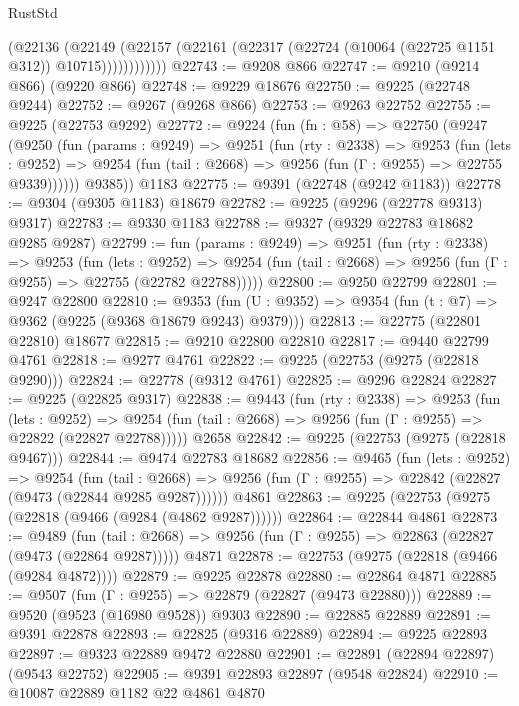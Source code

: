 \begin{lexlean}{RustStd}
\begin{coremodule}
                (@22136
                  (@22149
                    (@22157 (@22161 (@22317 (@22724 (@10064 (@22725 @1151 @312)) @10715))))))))))))
@22743 := @9208 @866
@22747 := @9210 (@9214 @866) (@9220 @866)
@22748 := @9229 @18676
@22750 := @9225 (@22748 @9244)
@22752 := @9267 (@9268 @866)
@22753 := @9263 @22752
@22755 := @9225 (@22753 @9292)
@22772 := @9224
    (fun (fn : @58) =>
    @22750
      (@9247
        (@9250
          (fun (params : @9249) =>
          @9251
            (fun (rty : @2338) =>
            @9253
              (fun (lets : @9252) =>
              @9254 (fun (tail : @2668) => @9256 (fun (Γ : @9255) => @22755 @9339))))))
        @9385))
    @1183
@22775 := @9391 (@22748 (@9242 @1183))
@22778 := @9304 (@9305 @1183) @18679
@22782 := @9225 (@9296 (@22778 @9313) @9317)
@22783 := @9330 @1183
@22788 := @9327 (@9329 @22783 @18682 @9285 @9287)
@22799 := fun (params : @9249) =>
  @9251
    (fun (rty : @2338) =>
    @9253
      (fun (lets : @9252) =>
      @9254 (fun (tail : @2668) => @9256 (fun (Γ : @9255) => @22755 (@22782 @22788)))))
@22800 := @9250 @22799
@22801 := @9247 @22800
@22810 := @9353
    (fun (U : @9352) => @9354 (fun (t : @7) => @9362 (@9225 (@9368 @18679 @9243) @9379)))
@22813 := @22775 (@22801 @22810) @18677
@22815 := @9210 @22800 @22810
@22817 := @9440 @22799 @4761
@22818 := @9277 @4761
@22822 := @9225 (@22753 (@9275 (@22818 @9290)))
@22824 := @22778 (@9312 @4761)
@22825 := @9296 @22824
@22827 := @9225 (@22825 @9317)
@22838 := @9443
    (fun (rty : @2338) =>
    @9253
      (fun (lets : @9252) =>
      @9254 (fun (tail : @2668) => @9256 (fun (Γ : @9255) => @22822 (@22827 @22788)))))
    @2658
@22842 := @9225 (@22753 (@9275 (@22818 @9467)))
@22844 := @9474 @22783 @18682
@22856 := @9465
    (fun (lets : @9252) =>
    @9254
      (fun (tail : @2668) =>
      @9256 (fun (Γ : @9255) => @22842 (@22827 (@9473 (@22844 @9285 @9287))))))
    @4861
@22863 := @9225 (@22753 (@9275 (@22818 (@9466 (@9284 (@4862 @9287))))))
@22864 := @22844 @4861
@22873 := @9489
    (fun (tail : @2668) => @9256 (fun (Γ : @9255) => @22863 (@22827 (@9473 (@22864 @9287)))))
    @4871
@22878 := @22753 (@9275 (@22818 (@9466 (@9284 @4872))))
@22879 := @9225 @22878
@22880 := @22864 @4871
@22885 := @9507 (fun (Γ : @9255) => @22879 (@22827 (@9473 @22880)))
@22889 := @9520 (@9523 (@16980 @9528)) @9303
@22890 := @22885 @22889
@22891 := @9391 @22878
@22893 := @22825 (@9316 @22889)
@22894 := @9225 @22893
@22897 := @9323 @22889 @9472 @22880
@22901 := @22891 (@22894 @22897) (@9543 @22752)
@22905 := @9391 @22893 @22897 (@9548 @22824)
@22910 := @10087 @22889 @1182 @22 @4861 @4870

\end{coremodule}
\end{lexlean}
